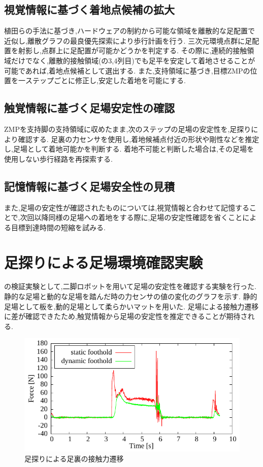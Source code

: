 \documentclass[twocolumn]{preport}
\begin{document}
\subsection{視覚情報に基づく着地点候補の拡大}\label{vision_sec}
植田ら\cite{ueda2015dron}の手法に基づき,ハードウェアの制約から可能な領域を離散的な足配置で近似し,離散グラフの最良優先探索により歩行計画を行う.
三次元環境点群に足配置を射影し,点群上に足配置が可能かどうかを判定する.
その際に,連続的接触領域だけでなく,離散的接触領域(の3,4列目)でも足平を安定して着地させることが可能であれば,着地点候補として選出する.
また,支持領域に基づき,目標ZMPの位置を一ステップごとに修正し,安定した着地を可能にする.

\subsection{触覚情報に基づく足場安定性の確認}\label{force_sensor_sec}
ZMPを支持脚の支持領域に収めたまま,次のステップの足場の安定性を,足探りにより確認する.
足裏の力センサを使用し,着地候補点付近の形状や剛性などを推定し,足場として着地可能かを判断する.
着地不可能と判断した場合は,その足場を使用しない歩行経路を再探索する.

\subsection{記憶情報に基づく足場安全性の見積}\label{memory_sec}
また,足場の安定性が確認されたものについては,視覚情報と合わせて記憶することで,次回以降同様の足場への着地をする際に,足場の安定性確認を省くことによる目標到達時間の短縮を試みる.


\section{足探りによる足場環境確認実験}
の検証実験として,二脚ロボットを用いて足場の安定性を確認する実験を行った.
静的な足場と動的な足場を踏んだ時の力センサの値の変化のグラフを示す.
静的足場として板を,動的足場として柔らかいマットを用いた.
足場による接触力遷移に差が確認できたため,触覚情報から足場の安定性を推定できることが期待される.

\begin{figure}[tbh]
 \begin{center}
   \centering
   \includegraphics[width=0.8\columnwidth]{exp_foothold_check.pdf}
   \caption{足探りによる足裏の接触力遷移}
   \label{figure:exp}
 \end{center}
\end{figure}
\end{document}
